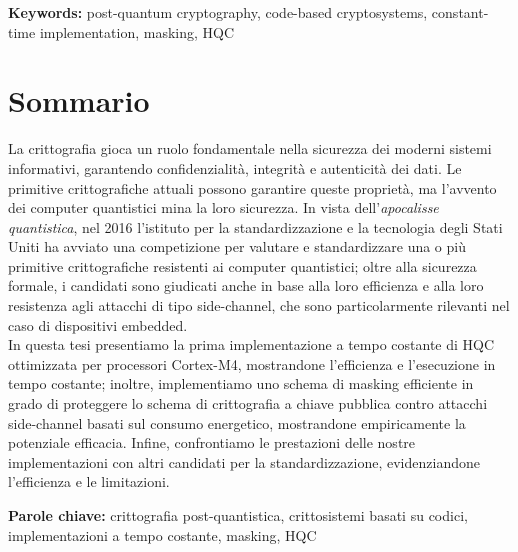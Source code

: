 \documentclass{Configuration_Files/PoliMi3i_thesis}
\theoremstyle{definition}
\theoremstyle{remark}
\begin{document}
\textbf{Keywords:} post-quantum cryptography, code-based cryptosystems, constant-time implementation, masking, HQC

\chapter*{Sommario}
La crittografia gioca un ruolo fondamentale nella sicurezza dei moderni sistemi informativi, garantendo
confidenzialità, integrità e autenticità dei dati. Le primitive crittografiche attuali possono
garantire queste proprietà, ma l'avvento dei computer quantistici mina la loro sicurezza.
In vista dell'\emph{apocalisse quantistica}, nel 2016 l'istituto per la standardizzazione e la tecnologia degli 
Stati Uniti ha avviato una competizione per valutare e standardizzare una o più primitive crittografiche
resistenti ai computer quantistici; oltre alla sicurezza formale, i candidati sono giudicati anche in base
alla loro efficienza e alla loro resistenza agli attacchi di tipo side-channel, che sono particolarmente
rilevanti nel caso di dispositivi embedded.\\
In questa tesi presentiamo la prima implementazione a tempo costante di HQC ottimizzata per processori 
Cortex-M4, mostrandone l'efficienza e l'esecuzione in tempo costante; inoltre, implementiamo uno schema di masking
efficiente in grado di proteggere lo schema di crittografia a chiave pubblica contro attacchi side-channel
basati sul consumo energetico, mostrandone empiricamente la potenziale efficacia. Infine, confrontiamo le prestazioni delle 
nostre implementazioni con altri candidati per la standardizzazione, evidenziandone l'efficienza e le limitazioni.

\textbf{Parole chiave:} crittografia post-quantistica, crittosistemi basati su codici, implementazioni a tempo costante, masking, HQC %


\thispagestyle{empty}
\tableofcontents %
\thispagestyle{empty}
\cleardoublepage

%
%
%    
%
\end{document}
